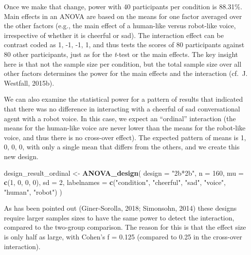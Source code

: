 \documentclass[
  ,man,floatsintext]{apa6}
\newenvironment{Shaded}{\begin{snugshade}}{\end{snugshade}}
\newcommand{\DataTypeTok}[1]{\textcolor[rgb]{0.13,0.29,0.53}{#1}}
\newcommand{\DecValTok}[1]{\textcolor[rgb]{0.00,0.00,0.81}{#1}}
\newcommand{\KeywordTok}[1]{\textcolor[rgb]{0.13,0.29,0.53}{\textbf{#1}}}
\newcommand{\NormalTok}[1]{#1}
\newcommand{\StringTok}[1]{\textcolor[rgb]{0.31,0.60,0.02}{#1}}
\begin{document}
Once we make that change, power with 40 participants per condition is 88.31\%.
Main effects in an ANOVA are based on the means for one factor averaged over the other factors (e.g., the main effect of a human-like versus robot-like voice, irrespective of whether it is cheerful or sad).
The interaction effect can be contrast coded as 1, -1, -1, 1, and thus tests the scores of 80 participants against 80 other participants, just as for the \emph{t}-test or the main effects.
The key insight here is that not the sample size per condition, but the total sample size over all other factors determines the power for the main effects and the interaction (cf.~J. Westfall, 2015b).

We can also examine the statistical power for a pattern of results that indicated that there was no difference in interacting with a cheerful of sad conversational agent with a robot voice.
In this case, we expect an \enquote{ordinal} interaction (the means for the human-like voice are never lower than the means for the robot-like voice, and thus there is no cross-over effect).
The expected pattern of means is 1, 0, 0, 0, with only a single mean that differs from the others, and we create this new design.

\begin{Shaded}
\begin{Highlighting}[]
\NormalTok{design_result_ordinal <-}\StringTok{ }\KeywordTok{ANOVA_design}\NormalTok{(}
  \DataTypeTok{design =} \StringTok{"2b*2b"}\NormalTok{,}
  \DataTypeTok{n =} \DecValTok{160}\NormalTok{,}
  \DataTypeTok{mu =} \KeywordTok{c}\NormalTok{(}\DecValTok{1}\NormalTok{, }\DecValTok{0}\NormalTok{, }\DecValTok{0}\NormalTok{, }\DecValTok{0}\NormalTok{),}
  \DataTypeTok{sd =} \DecValTok{2}\NormalTok{,}
  \DataTypeTok{labelnames =} \KeywordTok{c}\NormalTok{(}\StringTok{"condition"}\NormalTok{, }\StringTok{"cheerful"}\NormalTok{, }\StringTok{"sad"}\NormalTok{, }
                 \StringTok{"voice"}\NormalTok{, }\StringTok{"human"}\NormalTok{, }\StringTok{"robot"}\NormalTok{)}
\NormalTok{)}
\end{Highlighting}
\end{Shaded}

As has been pointed out (Giner-Sorolla, 2018; Simonsohn, 2014) these designs require larger samples sizes to have the same power to detect the interaction, compared to the two-group comparison.
The reason for this is that the effect size is only half as large, with Cohen's f = 0.125 (compared to 0.25 in the cross-over interaction).
\end{document}
